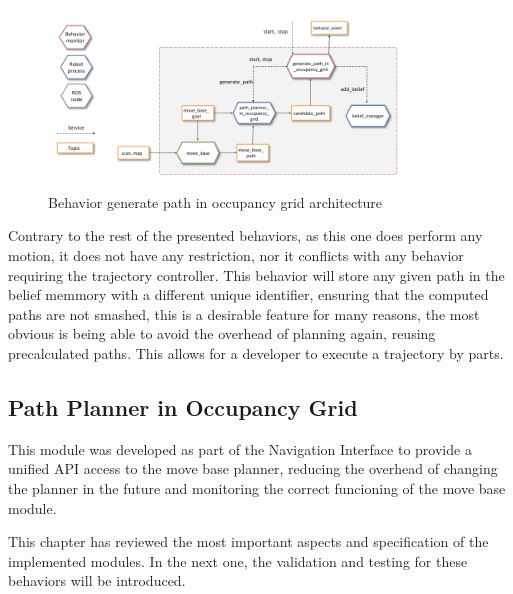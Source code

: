   \begin{figure}[h]
    \centering
    \includegraphics[width=0.85\textwidth]{./Figures/BehaviorGPArquitecture.png}
    \caption{Behavior generate path in occupancy grid architecture}
    \label{ch_4:fig:behav_gp}
  \end{figure}

  Contrary to the rest of the presented behaviors, as this one does perform any motion, it does not have any restriction, nor it conflicts with any behavior requiring the trajectory controller. This behavior will store any given path in the belief memmory with a different unique identifier, ensuring that the computed paths are not smashed, this is a desirable feature for many reasons, the most obvious is being able to avoid the overhead of planning again, reusing precalculated paths. This allows for a developer to execute a trajectory by parts.

\subsection{Path Planner in Occupancy Grid} \label{ch_4:subsect:path_planner}

  This module was developed as part of the Navigation Interface to provide a unified API access to the move base planner, reducing the overhead of changing the planner in the future and monitoring the correct funcioning of the move base module.

This chapter has reviewed the most important aspects and specification of the implemented modules. In the next one, the validation and testing for these behaviors will be introduced.

